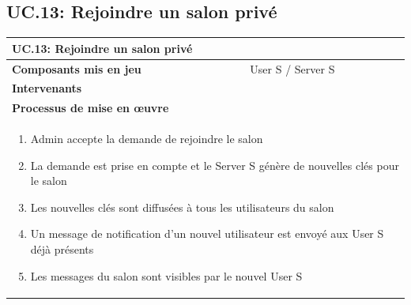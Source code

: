 \documentclass[a4paper,11pt,french]{article}
\begin{document}
\subsection{UC.13: Rejoindre un salon privé}
\begin{center}
	\vspace*{0.7cm}
	\begin{tabularx}{16cm}{|l|X|}
	\hline
	\multicolumn{2}{|l|}{\textbf{UC.13: Rejoindre un salon privé}}\\
	\hline
	\textbf{Composants mis en jeu} & User S / Server S \\
	\hline
	\textbf{Intervenants} &  \\
	\hline
	\multicolumn{2}{|l|}{\textbf{Processus de mise en \oe uvre}}\\
	\hline
	\multicolumn{2}{|p{15cm}|}{\begin{enumerate}\item Admin accepte la demande de rejoindre le salon \item La demande est prise en compte et le Server S génère de nouvelles clés pour le salon \item Les nouvelles clés sont diffusées à tous les utilisateurs du salon \item Un message de notification d'un nouvel utilisateur est envoyé aux User S déjà présents \item Les messages du salon sont visibles par le nouvel User S \end{enumerate}}\\
	\hline
	\end{tabularx}
\end{center}

\end{document}
